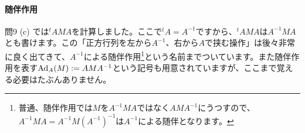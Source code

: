 \paragraph{随伴作用}

問9 (c) では${}^t\! AMA$を計算しました。ここで${}^t\! A=A^{-1}$ですから、${}^t\! AMA$は$A^{-1}MA$とも書けます。この「正方行列を左から$A^{-1}$、右から$A$で挟む操作」は後々非常に良く出てきて、$A^{-1}$による随伴作用\footnote{普通、随伴作用では$M$を$A^{-1}MA$ではなく$AMA^{-1}$にうつすので、$A^{-1}MA=A^{-1}M(A^{-1})^{-1}$は$A^{-1}$による随伴となります。}という名前までついています。また随伴作用を表す$\operatorname{Ad}_A(M):= AMA^{-1}$という記号も用意されていますが、ここまで覚える必要はたぶんありません。

